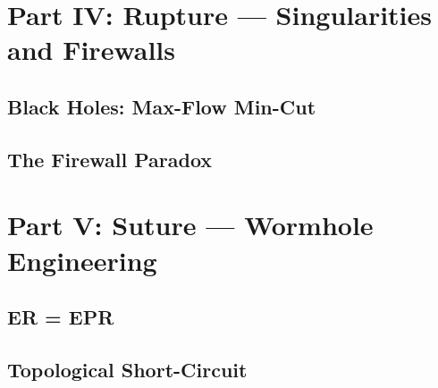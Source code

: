 \documentclass[11pt,a4paper,twoside]{book}
\begin{document}
\part{Part IV: Rupture --- Singularities and Firewalls}


\chapter{Black Holes: Max-Flow Min-Cut}




\chapter{The Firewall Paradox}




\part{Part V: Suture --- Wormhole Engineering}


\chapter{ER = EPR}




\chapter{Topological Short-Circuit}



\end{document}

